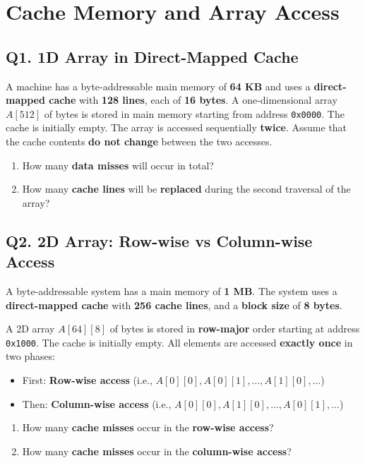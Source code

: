 \section{Cache Memory and Array Access}
\subsection*{Q1. 1D Array in Direct-Mapped Cache}

A machine has a byte-addressable main memory of \textbf{64 KB} and uses a \textbf{direct-mapped cache} with \textbf{128 lines}, each of \textbf{16 bytes}. A one-dimensional array $A[512]$ of bytes is stored in main memory starting from address \texttt{0x0000}. The cache is initially empty. The array is accessed sequentially \textbf{twice}. Assume that the cache contents \textbf{do not change} between the two accesses.


\begin{enumerate}[label=\textbf{Q1.\arabic*.}]
    \item How many \textbf{data misses} will occur in total?
    \item How many \textbf{cache lines} will be \textbf{replaced} during the second traversal of the array?
\end{enumerate}

\vspace{1em}
\subsection*{Q2. 2D Array: Row-wise vs Column-wise Access}

A byte-addressable system has a main memory of \textbf{1 MB}. The system uses a \textbf{direct-mapped cache} with \textbf{256 cache lines}, and a \textbf{block size} of \textbf{8 bytes}.

A 2D array $A[64][8]$ of bytes is stored in \textbf{row-major} order starting at address \texttt{0x1000}. The cache is initially empty. All elements are accessed \textbf{exactly once} in two phases:
\begin{itemize}
    \item First: \textbf{Row-wise access} (i.e., $A[0][0], A[0][1], \ldots, A[1][0], \ldots$)
    \item Then: \textbf{Column-wise access} (i.e., $A[0][0], A[1][0], \ldots, A[0][1], \ldots$)
\end{itemize}


\begin{enumerate}[label=\textbf{Q2.\arabic*.}]
    \item How many \textbf{cache misses} occur in the \textbf{row-wise access}?
    \item How many \textbf{cache misses} occur in the \textbf{column-wise access}?
\end{enumerate}


